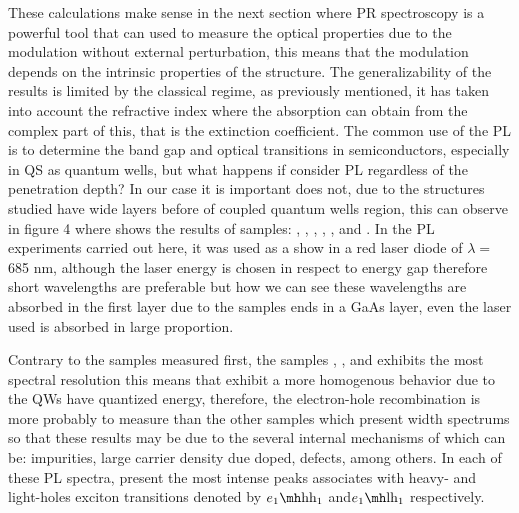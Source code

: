 These calculations make sense in the next section where PR spectroscopy is a powerful tool that can used to measure the optical properties due to the modulation without external perturbation, this means that the modulation depends on the intrinsic properties of the structure. The generalizability of the results is limited by the classical regime, as previously mentioned, it has taken into account the refractive index where the absorption can obtain from the complex part of this,  that is the extinction coefficient. The common use of the PL is to determine the band gap and optical transitions in semiconductors, especially in QS as quantum wells, but what happens if consider PL regardless of the penetration depth? 
In our case it is important does not, due to the structures studied have wide layers before of coupled quantum wells region, this can observe in figure 4 where shows the results of samples: , , , , , and .  In the PL experiments carried out here,  it was used as a show in  a red laser diode 
of  $\lambda=$685 nm, although the laser energy is chosen in respect to energy gap therefore short wavelengths are preferable but how we can see these wavelengths are absorbed in the first layer due to the samples ends in a GaAs layer, even the laser used is absorbed in large proportion. 

Contrary to the samples measured first, the samples , , and  exhibits the most spectral resolution this means that exhibit a more homogenous behavior  due to the QWs have quantized energy, therefore, the electron-hole recombination is more probably to measure than the other samples which present width spectrums so that these results may be due to the several internal mechanisms of which can be: impurities, large carrier density due doped,  defects, among others\cite{khmissi2010effectcarriers,kundrotas2005excitonic}. In each of these PL spectra,  present the most intense peaks associates with heavy- and light-holes exciton transitions denoted by $\thh{1}{1}$ and$\tlh{1}{1}$ respectively.


